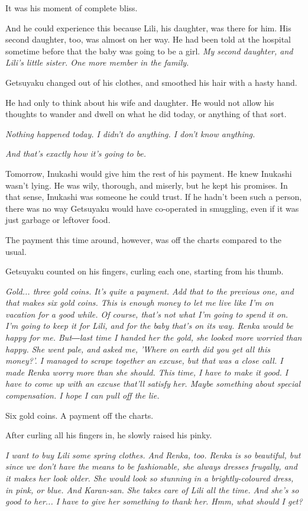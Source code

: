 It was his moment of complete bliss.

And he could experience this because Lili, his daughter, was there for
him. His second daughter, too, was almost on her way. He had been told
at the hospital sometime before that the baby was going to be a girl. \emph{My
second daughter, and Lili's little sister. One more member in the
family.}

Getsuyaku changed out of his clothes, and smoothed his hair with a hasty
hand.

He had only to think about his wife and daughter. He would not allow his
thoughts to wander and dwell on what he did today, or anything of that
sort.

\emph{Nothing happened today. I didn't do anything. I don't know anything.}

\emph{And that's exactly how it's going to be.}

Tomorrow, Inukashi would give him the rest of his payment. He knew
Inukashi wasn't lying. He was wily, thorough, and miserly, but he kept
his promises. In that sense, Inukashi was someone he could trust. If he
hadn't been such a person, there was no way Getsuyaku would have
co-operated in smuggling, even if it was just garbage or leftover food.

The payment this time around, however, was off the charts compared to
the usual.

Getsuyaku counted on his fingers, curling each one, starting from his
thumb.

\emph{Gold... three gold coins. It's quite a payment. Add that to the previous
one, and that makes six gold coins. This is enough money to let me live
like I'm on vacation for a good while. Of course, that's not what I'm
going to spend it on. I'm going to keep it for Lili, and for the baby
that's on its way. Renka would be happy for me. But―last time I handed
her the gold, she looked more worried than happy. She went pale, and
asked me, 'Where on earth did you get all this money?'. I managed to
scrape together an excuse, but that was a close call. I made Renka worry
more than she should. This time, I have to make it good. I have to come
up with an excuse that'll satisfy her. Maybe something about special
compensation. I hope I can pull off the lie.}

Six gold coins. A payment off the charts.

After curling all his fingers in, he slowly raised his pinky.

\emph{I want to buy Lili some spring clothes. And Renka, too. Renka is so
beautiful, but since we don't have the means to be fashionable, she
always dresses frugally, and it makes her look older. She would look so
stunning in a brightly-coloured dress, in pink, or blue. And Karan-san.
She takes care of Lili all the time. And she's so good to her... I have
to give her something to thank her. Hmm, what should I get?}

